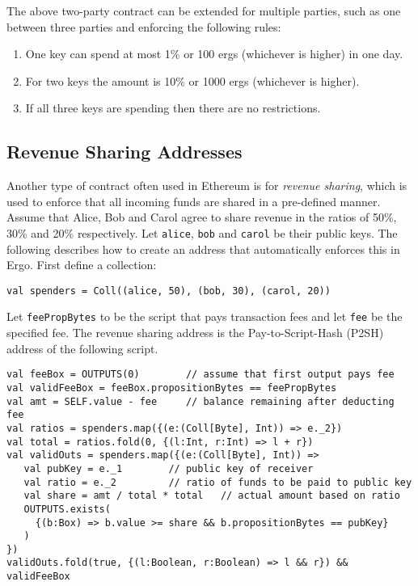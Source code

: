 \documentclass[runningheads]{llncs}
\begin{document}
The above two-party contract can be extended for multiple parties, such as one between three parties and enforcing the following rules:

\begin{enumerate}
	\item One key can spend at most 1\% or 100 ergs (whichever is higher) in one day.
	\item For two keys the amount is 10\% or 1000 ergs (whichever is higher).
	\item If all three keys are spending then there are no restrictions. 
\end{enumerate}

\subsection{Revenue Sharing Addresses}
\label{revenue-sharing}

Another type of contract often used in Ethereum is for {\em revenue sharing}, which is used to
enforce that all incoming funds are shared in a pre-defined manner.
Assume that Alice, Bob and Carol agree to share revenue in the ratios of 50\%, 30\% and 20\% respectively. Let \texttt{alice}, \texttt{bob} and \texttt{carol} be their public keys. The following describes how to create an address that automatically enforces this in Ergo. First define a collection: 
\begin{verbatim}
val spenders = Coll((alice, 50), (bob, 30), (carol, 20))
\end{verbatim}

Let \texttt{feePropBytes} to be the script that pays transaction fees and let \texttt{fee} be the specified fee. 
The revenue sharing address is the Pay-to-Script-Hash (P2SH) address of the following script.

\begin{verbatim}
val feeBox = OUTPUTS(0)        // assume that first output pays fee
val validFeeBox = feeBox.propositionBytes == feePropBytes
val amt = SELF.value - fee     // balance remaining after deducting fee
val ratios = spenders.map({(e:(Coll[Byte], Int)) => e._2})
val total = ratios.fold(0, {(l:Int, r:Int) => l + r})
val validOuts = spenders.map({(e:(Coll[Byte], Int)) =>
   val pubKey = e._1        // public key of receiver
   val ratio = e._2         // ratio of funds to be paid to public key
   val share = amt / total * total   // actual amount based on ratio
   OUTPUTS.exists(
     {(b:Box) => b.value >= share && b.propositionBytes == pubKey}
   )
})
validOuts.fold(true, {(l:Boolean, r:Boolean) => l && r}) && validFeeBox
\end{verbatim}
\end{document}
